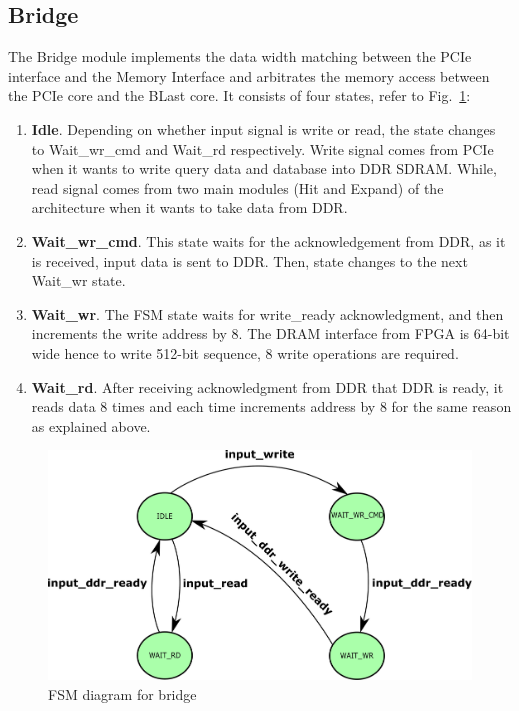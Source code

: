 \subsection{Bridge}
The Bridge module implements the data width matching between the PCIe interface and the Memory Interface and arbitrates the memory access between the PCIe core and the BLast core. 
It consists of four states, refer to Fig.~\ref{fig:bridge}:
\begin{enumerate}
\item \textbf{Idle}. Depending on whether input signal is write or read, the state changes to Wait\_wr\_cmd and Wait\_rd respectively. Write signal comes from PCIe when it wants to write query data and database into DDR SDRAM. While, read signal comes from two main modules (Hit and Expand) of the architecture when it wants to take data from DDR.
\item \textbf{Wait\_wr\_cmd}. This state waits for the acknowledgement from DDR, as it is received, input data is sent to DDR. Then, state changes to the next Wait\_wr state.
\item \textbf{Wait\_wr}. The FSM state waits for write\_ready acknowledgment, and then increments the write address by 8.
The DRAM interface from FPGA is 64-bit wide hence to write 512-bit sequence, 8 write operations are required. 
\item \textbf{Wait\_rd}. After receiving acknowledgment from DDR that DDR is ready, it reads data 8 times and each time increments address by 8 for the same reason as explained above. 
\end{enumerate}


\begin{figure}
\centering
\includegraphics[width=\columnwidth]{Figures/bridgeFSM.pdf}
\caption{FSM diagram for bridge} \label{fig:bridge}
\end{figure}


